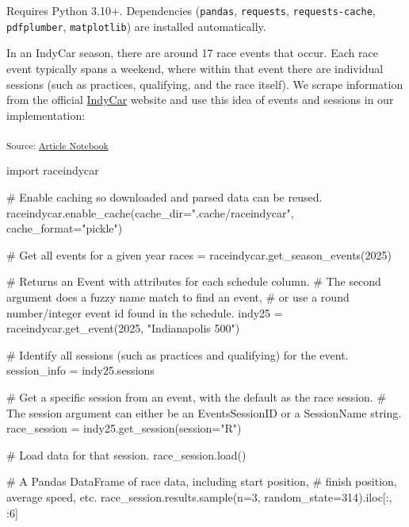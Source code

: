 \documentclass[
  10pt]{article}
\newenvironment{Shaded}{\begin{snugshade}}{\end{snugshade}}
\newcommand{\CommentTok}[1]{\textcolor[rgb]{0.37,0.37,0.37}{#1}}
\newcommand{\DecValTok}[1]{\textcolor[rgb]{0.68,0.00,0.00}{#1}}
\newcommand{\ImportTok}[1]{\textcolor[rgb]{0.00,0.46,0.62}{#1}}
\newcommand{\NormalTok}[1]{\textcolor[rgb]{0.00,0.23,0.31}{#1}}
\newcommand{\OperatorTok}[1]{\textcolor[rgb]{0.37,0.37,0.37}{#1}}
\newcommand{\StringTok}[1]{\textcolor[rgb]{0.13,0.47,0.30}{#1}}
\begin{document}
Requires Python 3.10+. Dependencies (\texttt{pandas}, \texttt{requests},
\texttt{requests-cache}, \texttt{pdfplumber}, \texttt{matplotlib}) are
installed automatically.

In an IndyCar season, there are around 17 race events that occur. Each
race event typically spans a weekend, where within that event there are
individual sessions (such as practices, qualifying, and the race
itself). We scrape information from the official
\href{https://www.indycar.com/}{IndyCar} website and use this idea of
events and sessions in our implementation:

\textsubscript{Source:
\href{https://ArchithSharma.github.io/raceindycar_manuscript/index.qmd.html}{Article
Notebook}}

\begin{Shaded}
\begin{Highlighting}[]
\ImportTok{import}\NormalTok{ raceindycar}

\CommentTok{\# Enable caching so downloaded and parsed data can be reused.}
\NormalTok{raceindycar.enable\_cache(cache\_dir}\OperatorTok{=}\StringTok{".cache/raceindycar"}\NormalTok{, cache\_format}\OperatorTok{=}\StringTok{"pickle"}\NormalTok{)}

\CommentTok{\# Get all events for a given year}
\NormalTok{races }\OperatorTok{=}\NormalTok{ raceindycar.get\_season\_events(}\DecValTok{2025}\NormalTok{)}

\CommentTok{\# Returns an Event with attributes for each schedule column.}
\CommentTok{\# The second argument does a fuzzy name match to find an event,}
\CommentTok{\# or use a round number/integer event id found in the schedule.}
\NormalTok{indy25 }\OperatorTok{=}\NormalTok{ raceindycar.get\_event(}\DecValTok{2025}\NormalTok{, }\StringTok{"Indianapolis 500"}\NormalTok{)}

\CommentTok{\# Identify all sessions (such as practices and qualifying) for the event.}
\NormalTok{session\_info }\OperatorTok{=}\NormalTok{ indy25.sessions}

\CommentTok{\# Get a specific session from an event, with the default as the race session.}
\CommentTok{\# The session argument can either be an EventsSessionID or a SessionName string.}
\NormalTok{race\_session }\OperatorTok{=}\NormalTok{ indy25.get\_session(session}\OperatorTok{=}\StringTok{"R"}\NormalTok{)}

\CommentTok{\# Load data for that session.}
\NormalTok{race\_session.load()}

\CommentTok{\# A Pandas DataFrame of race data, including start position,}
\CommentTok{\# finish position, average speed, etc.}
\NormalTok{race\_session.results.sample(n}\OperatorTok{=}\DecValTok{3}\NormalTok{, random\_state}\OperatorTok{=}\DecValTok{314}\NormalTok{).iloc[:, :}\DecValTok{6}\NormalTok{]}
\end{Highlighting}
\end{Shaded}
\end{document}

